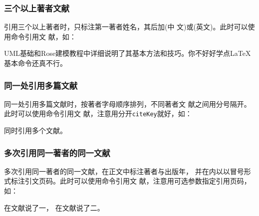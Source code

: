 \subsubsection{三个以上著者文献}

引用三个以上著者时，只标注第一著者姓名，其后加(中
文)或(英文)。此时可以使用命令引用文
献，如：

\begin{center}
  \begin{minipage}[h]{0.9\linewidth}    
      UML基础和Rose建模教程中详细说明了其基本方法和技巧\cite{蔡敏2006--}。你不好好学点\LaTeX{}基本命令还真不行\cite{r9}。%
  \end{minipage}
\end{center}

\subsubsection{同一处引用多篇文献}

同一处引用多篇文献时，按著者字母顺序排列，不同著者文
献之间用分号隔开。此时可以使用命令引用文
献，注意用分开\texttt{citeKey}就好，如：

\begin{center}
  \begin{minipage}[h]{0.9\linewidth}    
      同时引用多个文献\cite{r2,r3,r4,r6}。%
  \end{minipage}
\end{center}
  
\subsubsection{多次引用同一著者的同一文献}

多次引用同一著者的同一文献，在正文中标注著者与出版年，
并在\qtmark{()}内以以冒号形式标注引文页码。此时可以使用命令引用文
献，注意用可选参数指定引用页码，如：

\begin{center}
  \begin{minipage}[h]{0.9\linewidth}    
      在文献\parencite[20-22]{程根伟1999-32-36}说了一， 在文献\parencite[55-60]{程根伟1999-32-36}说了二。%
  \end{minipage}
\end{center}

